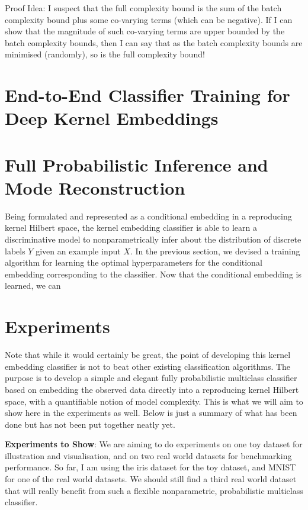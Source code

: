 \documentclass{article}
\newcommand{\note}[1]{{\color{orange} #1}}
\begin{document}
		Proof Idea: I suspect that the full complexity bound is the sum of the batch complexity bound plus some co-varying terms (which can be negative). If I can show that the magnitude of such co-varying terms are upper bounded by the batch complexity bounds, then I can say that as the batch complexity bounds are minimised (randomly), so is the full complexity bound!
	
\section{End-to-End Classifier Training for Deep Kernel Embeddings}
\label{sec:deep_kernel_embeddings}

\section{Full Probabilistic Inference and Mode Reconstruction}
\label{sec:mode_reconstruction}

	Being formulated and represented as a conditional embedding in a reproducing kernel Hilbert space, the kernel embedding classifier is able to learn a discriminative model to nonparametrically infer about the distribution of discrete labels $Y$ given an example input $X$. In the previous section, we devised a training algorithm for learning the optimal hyperparameters for the conditional embedding corresponding to the classifier. Now that the conditional embedding is learned, we can 

\section{Experiments}

	\note{Note that while it would certainly be great, the point of developing this kernel embedding classifier is not to beat other existing classification algorithms. The purpose is to develop a simple and elegant fully probabilistic multiclass classifier based on embedding the observed data directly into a reproducing kernel Hilbert space, with a quantifiable notion of model complexity. This is what we will aim to show here in the experiments as well. Below is just a summary of what has been done but has not been put together neatly yet.}
	
	\textbf{Experiments to Show}: We are aiming to do experiments on one toy dataset for illustration and visualisation, and on two real world datasets for benchmarking performance. So far, I am using the iris dataset for the toy dataset, and MNIST for one of the real world datasets. We should still find a third real world dataset that will really benefit from such a flexible nonparametric, probabilistic multiclass classifier.
	
\end{document}
